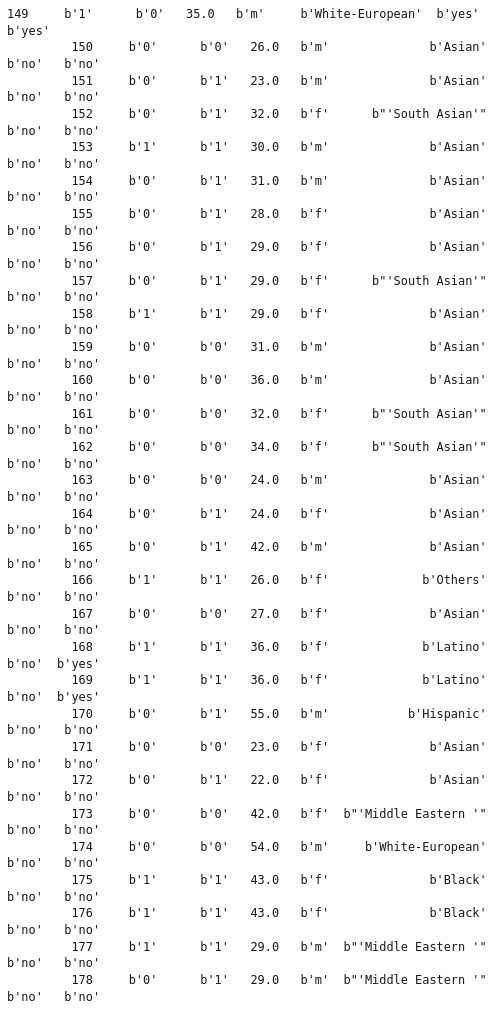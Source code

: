 \documentclass[11pt]{article}
\begin{document}
\begin{Verbatim}[commandchars=\\\{\}]
         149     b'1'      b'0'   35.0   b'm'     b'White-European'  b'yes'  b'yes'   
         150     b'0'      b'0'   26.0   b'm'              b'Asian'   b'no'   b'no'   
         151     b'0'      b'1'   23.0   b'm'              b'Asian'   b'no'   b'no'   
         152     b'0'      b'1'   32.0   b'f'      b"'South Asian'"   b'no'   b'no'   
         153     b'1'      b'1'   30.0   b'm'              b'Asian'   b'no'   b'no'   
         154     b'0'      b'1'   31.0   b'm'              b'Asian'   b'no'   b'no'   
         155     b'0'      b'1'   28.0   b'f'              b'Asian'   b'no'   b'no'   
         156     b'0'      b'1'   29.0   b'f'              b'Asian'   b'no'   b'no'   
         157     b'0'      b'1'   29.0   b'f'      b"'South Asian'"   b'no'   b'no'   
         158     b'1'      b'1'   29.0   b'f'              b'Asian'   b'no'   b'no'   
         159     b'0'      b'0'   31.0   b'm'              b'Asian'   b'no'   b'no'   
         160     b'0'      b'0'   36.0   b'm'              b'Asian'   b'no'   b'no'   
         161     b'0'      b'0'   32.0   b'f'      b"'South Asian'"   b'no'   b'no'   
         162     b'0'      b'0'   34.0   b'f'      b"'South Asian'"   b'no'   b'no'   
         163     b'0'      b'0'   24.0   b'm'              b'Asian'   b'no'   b'no'   
         164     b'0'      b'1'   24.0   b'f'              b'Asian'   b'no'   b'no'   
         165     b'0'      b'1'   42.0   b'm'              b'Asian'   b'no'   b'no'   
         166     b'1'      b'1'   26.0   b'f'             b'Others'   b'no'   b'no'   
         167     b'0'      b'0'   27.0   b'f'              b'Asian'   b'no'   b'no'   
         168     b'1'      b'1'   36.0   b'f'             b'Latino'   b'no'  b'yes'   
         169     b'1'      b'1'   36.0   b'f'             b'Latino'   b'no'  b'yes'   
         170     b'0'      b'1'   55.0   b'm'           b'Hispanic'   b'no'   b'no'   
         171     b'0'      b'0'   23.0   b'f'              b'Asian'   b'no'   b'no'   
         172     b'0'      b'1'   22.0   b'f'              b'Asian'   b'no'   b'no'   
         173     b'0'      b'0'   42.0   b'f'  b"'Middle Eastern '"   b'no'   b'no'   
         174     b'0'      b'0'   54.0   b'm'     b'White-European'   b'no'   b'no'   
         175     b'1'      b'1'   43.0   b'f'              b'Black'   b'no'   b'no'   
         176     b'1'      b'1'   43.0   b'f'              b'Black'   b'no'   b'no'   
         177     b'1'      b'1'   29.0   b'm'  b"'Middle Eastern '"   b'no'   b'no'   
         178     b'0'      b'1'   29.0   b'm'  b"'Middle Eastern '"   b'no'   b'no'   

\end{Verbatim}
\end{document}
